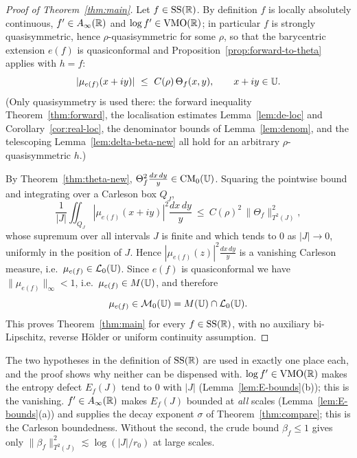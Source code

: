 \begin{proof}[Proof of Theorem~\ref{thm:main}]
	Let $f\in\mathrm{SS}(\mathbb{R})$. By definition $f$ is locally absolutely continuous,
	$f'\in A_\infty(\mathbb{R})$ and $\log f'\in\mathrm{VMO}(\mathbb{R})$; in particular $f$ is strongly
	quasisymmetric, hence $\rho$-quasisymmetric for some $\rho$, so that the
	barycentric extension $e(f)$ is quasiconformal and
	Proposition~\ref{prop:forward-to-theta} applies with $h=f$:
	\[
	|\mu_{e(f)}(x+iy)|\ \le\ C(\rho)\,\Theta_f(x,y),\qquad x+iy\in\U .
	\]
	(Only quasisymmetry is used there: the forward inequality
	Theorem~\ref{thm:forward}, the localisation estimates
	Lemma~\ref{lem:de-loc} and Corollary~\ref{cor:real-loc}, the denominator bounds
	of Lemma~\ref{lem:denom}, and the telescoping Lemma~\ref{lem:delta-beta-new}
	all hold for an arbitrary $\rho$-quasisymmetric $h$.)
	
	By Theorem~\ref{thm:theta-new}, $\Theta_f^2\frac{dx\,dy}{y}\in\mathrm{CM}_0(\mathbb{U})$.
	Squaring the pointwise bound and integrating over a Carleson box $Q_J$,
	\[
	\frac1{|J|}\iint_{Q_J}|\mu_{e(f)}(x+iy)|^2\frac{dx\,dy}{y}
	\ \le\ C(\rho)^2\,\|\Theta_f\|_{T^2(J)}^2 ,
	\]
	whose supremum over all intervals $J$ is finite and which tends to $0$ as
	$|J|\to0$, uniformly in the position of $J$. Hence
	$|\mu_{e(f)}(z)|^2\frac{dx\,dy}{y}$ is a vanishing Carleson measure, i.e.\
	$\mu_{e(f)}\in\mathcal{L}_0(\mathbb{U})$. Since $e(f)$ is quasiconformal we have
	$\|\mu_{e(f)}\|_\infty<1$, i.e.\ $\mu_{e(f)}\in M(\mathbb{U})$, and therefore
	\[
	\mu_{e(f)}\in\mathcal{M}_0(\mathbb{U})=M(\mathbb{U})\cap\mathcal{L}_0(\mathbb{U}).
	\]
	This proves Theorem~\ref{thm:main} for every $f\in\mathrm{SS}(\mathbb{R})$, with no auxiliary
	bi-Lipschitz, reverse H\"older or uniform continuity assumption.
\end{proof}

\begin{remark}
	The two hypotheses in the definition of $\mathrm{SS}(\mathbb{R})$ are used in exactly one
	place each, and the proof shows why neither can be dispensed with.
	$\log f'\in\mathrm{VMO}(\mathbb{R})$ makes the entropy defect $E_f(J)$ tend to $0$ with $|J|$
	(Lemma~\ref{lem:E-bounds}(b)); this is the vanishing. $f'\in A_\infty(\mathbb{R})$
	makes $E_f(J)$ bounded at \emph{all} scales (Lemma~\ref{lem:E-bounds}(a)) and
	supplies the decay exponent $\sigma$ of Theorem~\ref{thm:compare}; this is the
	Carleson boundedness. Without the second, the crude bound $\beta_f\le1$ gives
	only $\|\beta_f\|_{T^2(J)}^2\lesssim\log(|J|/r_0)$ at large scales.
\end{remark}


